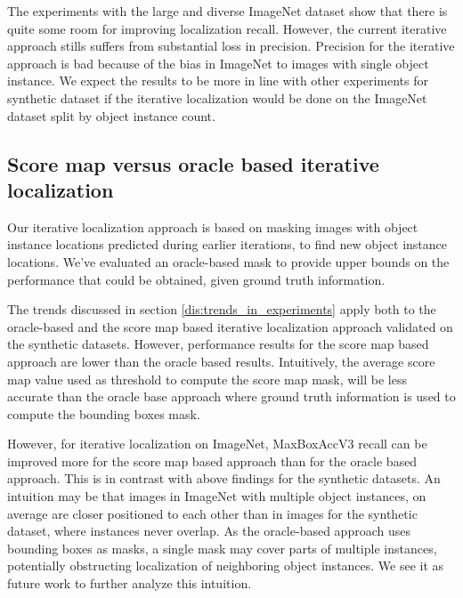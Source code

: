 The experiments with the large and diverse ImageNet dataset show that there is quite some room for improving localization recall. However, the current iterative approach stills suffers from substantial loss in precision. Precision for the iterative approach is bad because of the bias in ImageNet to images with single object instance. We expect the results to be more in line with other experiments for synthetic dataset if the iterative localization would be done on the ImageNet dataset split by object instance count.

\subsection{Score map versus oracle based iterative localization}
Our iterative localization approach is based on masking images with object instance locations predicted during earlier iterations, to find new object instance locations. We've evaluated an oracle-based mask to provide upper bounds on the performance that could be obtained, given ground truth information. 

The trends discussed in section \ref{dis:trends_in_experiments} apply both to the oracle-based and the score map based iterative localization approach validated on the synthetic datasets. However, performance results for the score map based approach are lower than the oracle based results. Intuitively, the average score map value used as threshold to compute the score map mask, will be less accurate than the oracle base  approach where ground truth information is used to compute the bounding boxes mask. 

However, for iterative localization on ImageNet, MaxBoxAccV3 recall can be improved more for the score map based approach than for the oracle based approach. This is in contrast with above findings for the synthetic datasets. An intuition may be that images in ImageNet with multiple object instances, on average are closer positioned to each other than in images for the synthetic dataset, where instances never overlap. As the oracle-based approach uses bounding boxes as masks, a single mask may cover parts of multiple instances, potentially obstructing localization of neighboring object instances. We see it as future work to further analyze this intuition.

